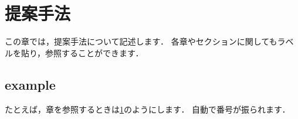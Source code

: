 


\chapter{提案手法}
\label{sec:chap_4}

この章では，提案手法について記述します．
各章やセクションに関してもラベルを貼り，参照することができます．

\section{example}

たとえば，章を参照するときは\ref{sec:chap_4}のようにします．
自動で番号が振られます．
